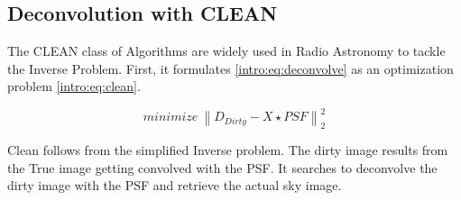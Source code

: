 \subsection{Deconvolution with CLEAN}
The CLEAN class of Algorithms\cite{hogbom1974aperture}\cite{schwab1984relaxing}\cite{rich2008multi}\cite{rau2011multi} are widely used in Radio Astronomy to tackle the Inverse Problem. First, it formulates \eqref{intro:eq:deconvolve} as an optimization problem  \eqref{intro:eq:clean}.

\begin{equation}\label{intro:eq:clean}
minimize \: \left \| D_{Dirty} - X \star PSF \right \|_2^2
\end{equation}



Clean follows from the simplified Inverse problem. The dirty image results from the True image getting convolved with the PSF. It searches to deconvolve the dirty image with the PSF and retrieve the actual sky image.

